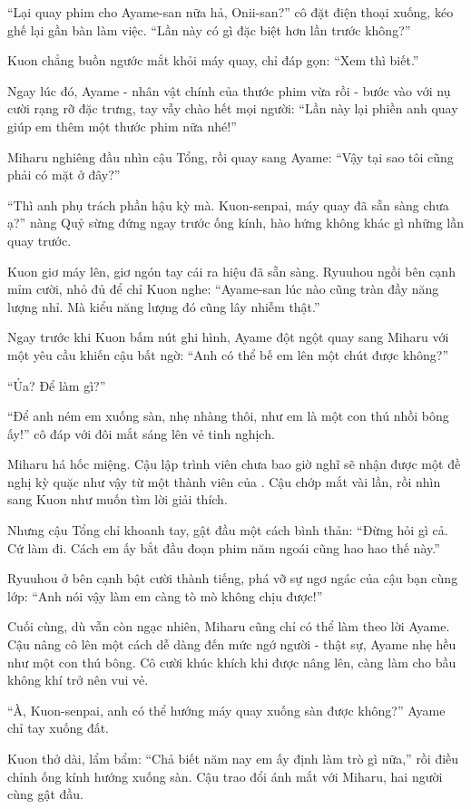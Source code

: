 \documentclass[../main.tex]{subfiles}
\begin{document}
``Lại quay phim cho Ayame-san nữa hả, Onii-san?'' cô đặt điện thoại xuống, kéo ghế lại gần bàn làm việc. ``Lần này có gì đặc biệt hơn lần trước không?''

Kuon chẳng buồn ngước mắt khỏi máy quay, chỉ đáp gọn: ``Xem thì biết.''

Ngay lúc đó, Ayame - nhân vật chính của thước phim vừa rồi - bước vào với nụ cười rạng rỡ đặc trưng, tay vẫy chào hết mọi người: ``Lần này lại phiền anh quay giúp em thêm một thước phim nữa nhé!''

Miharu nghiêng đầu nhìn cậu Tổng, rồi quay sang Ayame: ``Vậy tại sao tôi cũng phải có mặt ở đây?''

``Thì anh phụ trách phần hậu kỳ mà. Kuon-senpai, máy quay đã sẵn sàng chưa ạ?'' nàng Quỷ sừng đứng ngay trước ống kính, hào hứng không khác gì những lần quay trước.

Kuon giơ máy lên, giơ ngón tay cái ra hiệu đã sẵn sàng. Ryuuhou ngồi bên cạnh mỉm cười, nhỏ đủ để chỉ Kuon nghe: ``Ayame-san lúc nào cũng tràn đầy năng lượng nhỉ. Mà kiểu năng lượng đó cũng lây nhiễm thật.''

Ngay trước khi Kuon bấm nút ghi hình, Ayame đột ngột quay sang Miharu với một yêu cầu khiến cậu bất ngờ: ``Anh có thể bế em lên một chút được không?''

``Ủa? Để làm gì?''

``Để anh ném em xuống sàn, nhẹ nhàng thôi, như em là một con thú nhồi bông ấy!'' cô đáp với đôi mắt sáng lên vẻ tinh nghịch.

Miharu há hốc miệng. Cậu lập trình viên chưa bao giờ nghĩ sẽ nhận được một đề nghị kỳ quặc như vậy từ một thành viên của \hll. Cậu chớp mắt vài lần, rồi nhìn sang Kuon như muốn tìm lời giải thích.

Nhưng cậu Tổng chỉ khoanh tay, gật đầu một cách bình thản: ``Đừng hỏi gì cả. Cứ làm đi. Cách em ấy bắt đầu đoạn phim năm ngoái cũng hao hao thế này.''

Ryuuhou ở bên cạnh bật cười thành tiếng, phá vỡ sự ngơ ngác của cậu bạn cùng lớp: ``Anh nói vậy làm em càng tò mò không chịu được!''

Cuối cùng, dù vẫn còn ngạc nhiên, Miharu cũng chỉ có thể làm theo lời Ayame. Cậu nâng cô lên một cách dễ dàng đến mức ngớ người - thật sự, Ayame nhẹ hều như một con thú bông. Cô cười khúc khích khi được nâng lên, càng làm cho bầu không khí trở nên vui vẻ.

``À, Kuon-senpai, anh có thể hướng máy quay xuống sàn được không?'' Ayame chỉ tay xuống đất.

Kuon thở dài, lẩm bẩm: ``Chả biết năm nay em ấy định làm trò gì nữa,'' rồi điều chỉnh ống kính hướng xuống sàn. Cậu trao đổi ánh mắt với Miharu, hai người cùng gật đầu.
\end{document}
